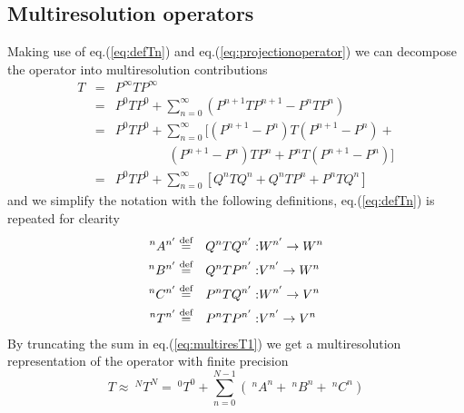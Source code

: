 \subsection{Multiresolution operators}
Making use of eq.(\ref{eq:defTn}) and eq.(\ref{eq:projectionoperator}) we can 
decompose the operator into multiresolution contributions
\begin{eqnarray}
	\nonumber
	T &=& P^\infty TP^\infty\\
	\nonumber
	&=& P^0 TP^0 + \sum_{n=0}^\infty (P^{n+1}TP^{n+1} - P^nTP^n)\\
	\nonumber
	&=& P^0 TP^0 + \sum_{n=0}^\infty [(P^{n+1}-P^n)T(P^{n+1}-P^n) + \\
	\nonumber
	&&\ \ \ \ \ \ \ \ \ \ \ \ \ \ \ \ \ \ \ (P^{n+1}-P^n)TP^n + 
														P^nT(P^{n+1}-P^n)]\\
	&=& P^0 TP^0 + \sum_{n=0}^\infty [Q^nTQ^n + Q^nTP^n + P^nTQ^n]
	\label{eq:multiresT1}
\end{eqnarray}
and we simplify the notation with the following definitions, 
eq.(\ref{eq:defTn}) is repeated for clearity
\begin{eqnarray}
	\begin{split}
		^nA^{n'} &\stackrel{\text{def}}{\hbox{=}}& Q^nTQ^{n'}:& W^{n'}\rightarrow W^n\\
		^nB^{n'} &\stackrel{\text{def}}{\hbox{=}}& Q^nTP^{n'}:& V^{n'}\rightarrow W^n\\
		^nC^{n'} &\stackrel{\text{def}}{\hbox{=}}& P^nTQ^{n'}:& W^{n'}\rightarrow V^n\\
		^nT^{n'} &\stackrel{\text{def}}{\hbox{=}}& P^nTP^{n'}:& V^{n'}\rightarrow V^n
	\end{split}
	\label{eq:defABCT}
\end{eqnarray}
By truncating the sum in eq.(\ref{eq:multiresT1}) we get a multiresolution
representation of the operator with finite precision
\begin{equation}
	\label{eq:MRoper}
	T \approx\ ^NT^N =\ ^0T^0 + \sum_{n=0}^{N-1} (\ ^nA^n +\ ^nB^n +\ ^nC^n)
\end{equation}
